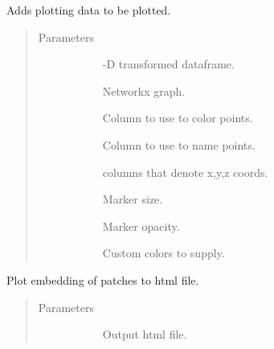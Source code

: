\documentclass[letterpaper,10pt,english]{sphinxmanual}
\begin{document}
\begin{fulllineitems}
\begin{fulllineitems}
\label{\detokenize{index:pathflowai.visualize.PlotlyPlot.add_plot}}
Adds plotting data to be plotted.
\begin{quote}\begin{description}
\item[{Parameters}] \leavevmode\begin{description}
\item[{}] -D transformed dataframe.

\item[{}] \leavevmode
Networkx graph.

\item[{}] \leavevmode
Column to use to color points.

\item[{}] \leavevmode
Column to use to name points.

\item[{}]  columns that denote x,y,z coords.

\item[{}] \leavevmode
Marker size.

\item[{}] \leavevmode
Marker opacity.

\item[{}] \leavevmode
Custom colors to supply.

\end{description}

\end{description}\end{quote}

\end{fulllineitems}


\begin{fulllineitems}
\label{\detokenize{index:pathflowai.visualize.PlotlyPlot.plot}}
Plot embedding of patches to html file.
\begin{quote}\begin{description}
\item[{Parameters}] \leavevmode\begin{description}
\item[{}] \leavevmode
Output html file.


\end{description}
\end{description}
\end{quote}
\end{fulllineitems}
\end{fulllineitems}
\end{document}
